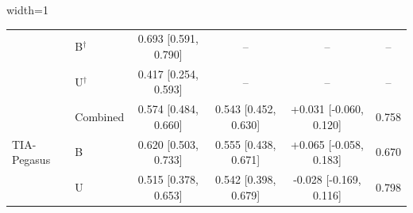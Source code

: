 \begin{table}[H]
\begin{adjustbox}{width=1\textwidth}
\begin{tabular}{llcccc}
   & B$^{\dagger}$ & 0.693 [0.591, 0.790] & -- & -- & -- \\
   & U$^{\dagger}$ & 0.417 [0.254, 0.593] & -- & -- & -- \\
  \hline
  \multirow{3}{*}{TIA-Pegasus} & Combined & 0.574 [0.484, 0.660] & 0.543 [0.452, 0.630] & +0.031 [-0.060, 0.120] & 0.758 \\
   & B & 0.620 [0.503, 0.733] & 0.555 [0.438, 0.671] & +0.065 [-0.058, 0.183] & 0.670 \\
   & U & 0.515 [0.378, 0.653] & 0.542 [0.398, 0.679] & -0.028 [-0.169, 0.116] & 0.798 \\
  \hline
  \end{tabular}
  \end{adjustbox}
  \label{tab:task3_robustness_nif_unified_cindex}
\end{table}
